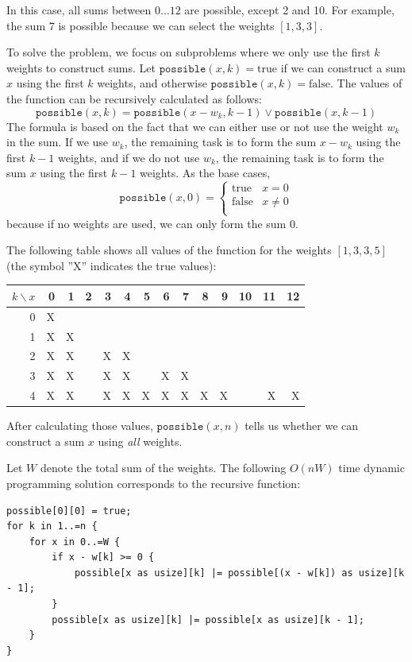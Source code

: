In this case, all sums between $0 \ldots 12$
are possible, except 2 and 10.
For example, the sum 7 is possible because we
can select the weights $[1,3,3]$.

To solve the problem, we focus on subproblems
where we only use the first $k$ weights
to construct sums.
Let $\texttt{possible}(x,k)=\textrm{true}$ if
we can construct a sum $x$
using the first $k$ weights,
and otherwise $\texttt{possible}(x,k)=\textrm{false}$.
The values of the function can be recursively
calculated as follows:
\[ \texttt{possible}(x,k) = \texttt{possible}(x-w_k,k-1) \lor \texttt{possible}(x,k-1) \]
The formula is based on the fact that we can
either use or not use the weight $w_k$ in the sum.
If we use $w_k$, the remaining task is to
form the sum $x-w_k$ using the first $k-1$ weights,
and if we do not use $w_k$,
the remaining task is to form the sum $x$
using the first $k-1$ weights.
As the base cases,
\begin{equation*}
    \texttt{possible}(x,0) = \begin{cases}
               \textrm{true}    & x = 0\\
               \textrm{false}   & x \neq 0 \\
           \end{cases}
\end{equation*}
because if no weights are used,
we can only form the sum 0.

The following table shows all values of the function
for the weights $[1,3,3,5]$ (the symbol ''X''
indicates the true values):

\begin{center}
\begin{tabular}{r|rrrrrrrrrrrrr}
$k \backslash x$ & 0 & 1 & 2 & 3 & 4 & 5 & 6 & 7 & 8 & 9 & 10 & 11 & 12 \\
\hline
 0 & X & \\
 1 & X & X \\
 2 & X & X & & X & X \\
 3 & X & X & & X & X & & X & X \\
 4 & X & X & & X & X & X & X & X & X & X & & X & X \\
\end{tabular}
\end{center}

After calculating those values, $\texttt{possible}(x,n)$
tells us whether we can construct a
sum $x$ using \emph{all} weights.

Let $W$ denote the total sum of the weights.
The following $O(nW)$ time
dynamic programming solution
corresponds to the recursive function:
\begin{lstlisting}
possible[0][0] = true;
for k in 1..=n {
    for x in 0..=W {
        if x - w[k] >= 0 {
            possible[x as usize][k] |= possible[(x - w[k]) as usize][k - 1];
        }
        possible[x as usize][k] |= possible[x as usize][k - 1];
    }
}
\end{lstlisting}

